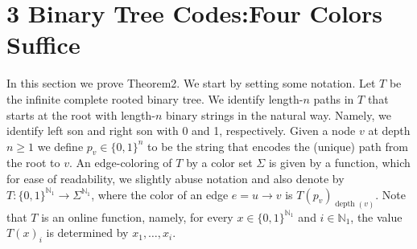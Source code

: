 \documentclass[10pt,a4paper]{article}
\begin{document}
\section*{3 Binary Tree Codes:Four Colors Suffice}
In this section we prove Theorem2. We start by setting some notation. Let $T$ be the infinite complete rooted binary tree. We identify length-$n$ paths in $T$ that starts at the root with length-$n$ binary strings in the natural way. Namely, we identify left son and right son with 0 and 1, respectively. Given a node $v$ at depth $n\ge1$ we define $p_v\in\{0,1\}^n$ to be the string that encodes the (unique) path from the root to $v$.
An edge-coloring of $T$ by a color set $\Sigma$ is given by a function, which for ease of readability, we slightly abuse notation and also denote by $T:\{0,1\}^{\mathbb N_1}\to\Sigma^{\mathbb N_1}$, where the color of an edge $e=u\to v$ is $T(p_v)_{\operatorname{depth}(v)}$. Note that $T$ is an online function, namely, for every $x\in\{0,1\}^{\mathbb N_1}$ and $i\in\mathbb N_1$, the value $T(x)_i$ is determined by $x_1,\ldots,x_i$.
\end{document}
